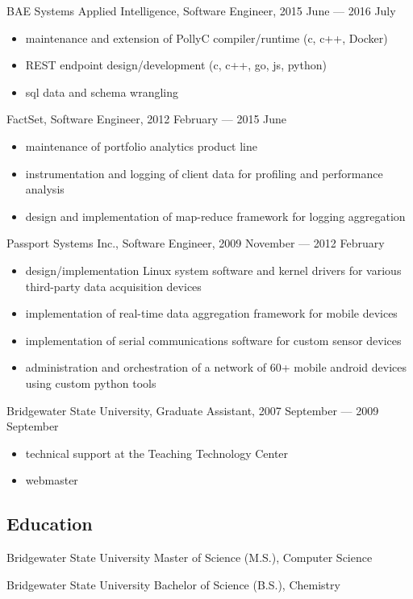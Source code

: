 \documentclass[letterpaper,11pt]{article}
\begin{document}
BAE Systems Applied Intelligence, Software Engineer, 2015 June --- 2016 July

\begin{itemize}
\item maintenance and extension of PollyC compiler/runtime (c, c++, Docker)
\item REST endpoint design/development (c, c++, go, js, python)
\item sql data and schema wrangling
\end{itemize}

FactSet, Software Engineer, 2012 February --- 2015 June

\begin{itemize}
\item maintenance of portfolio analytics product line
\item instrumentation and logging of client data for profiling and performance analysis
\item design and implementation of map-reduce framework for logging aggregation
\end{itemize}

Passport Systems Inc., Software Engineer, 2009 November --- 2012 February

\begin{itemize}
\item design/implementation Linux system software and kernel drivers for various
third-party data acquisition devices
\item implementation of real-time data aggregation framework for mobile devices
\item implementation of serial communications software for custom sensor devices
\item administration and orchestration of a network of 60+ mobile android devices using custom python tools
\end{itemize}

Bridgewater State University, Graduate Assistant, 2007 September --- 2009 September

\begin{itemize}
\item technical support at the Teaching Technology Center
\item webmaster
\end{itemize}

\subsection*{Education}

Bridgewater State University
Master of Science (M.S.), Computer Science

Bridgewater State University
Bachelor of Science (B.S.), Chemistry
\end{document}
